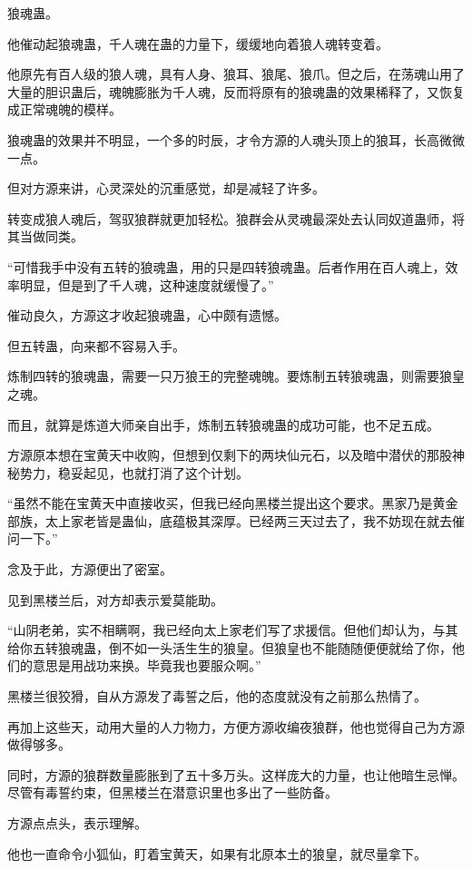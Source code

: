 \begin{this_body}
狼魂蛊。

他催动起狼魂蛊，千人魂在蛊的力量下，缓缓地向着狼人魂转变着。

他原先有百人级的狼人魂，具有人身、狼耳、狼尾、狼爪。但之后，在荡魂山用了大量的胆识蛊后，魂魄膨胀为千人魂，反而将原有的狼魂蛊的效果稀释了，又恢复成正常魂魄的模样。

狼魂蛊的效果并不明显，一个多的时辰，才令方源的人魂头顶上的狼耳，长高微微一点。

但对方源来讲，心灵深处的沉重感觉，却是减轻了许多。

转变成狼人魂后，驾驭狼群就更加轻松。狼群会从灵魂最深处去认同奴道蛊师，将其当做同类。

“可惜我手中没有五转的狼魂蛊，用的只是四转狼魂蛊。后者作用在百人魂上，效率明显，但是到了千人魂，这种速度就缓慢了。”

催动良久，方源这才收起狼魂蛊，心中颇有遗憾。

但五转蛊，向来都不容易入手。

炼制四转的狼魂蛊，需要一只万狼王的完整魂魄。要炼制五转狼魂蛊，则需要狼皇之魂。

而且，就算是炼道大师亲自出手，炼制五转狼魂蛊的成功可能，也不足五成。

方源原本想在宝黄天中收购，但想到仅剩下的两块仙元石，以及暗中潜伏的那股神秘势力，稳妥起见，也就打消了这个计划。

“虽然不能在宝黄天中直接收买，但我已经向黑楼兰提出这个要求。黑家乃是黄金部族，太上家老皆是蛊仙，底蕴极其深厚。已经两三天过去了，我不妨现在就去催问一下。”

念及于此，方源便出了密室。

见到黑楼兰后，对方却表示爱莫能助。

“山阴老弟，实不相瞒啊，我已经向太上家老们写了求援信。但他们却认为，与其给你五转狼魂蛊，倒不如一头活生生的狼皇。但狼皇也不能随随便便就给了你，他们的意思是用战功来换。毕竟我也要服众啊。”

黑楼兰很狡猾，自从方源发了毒誓之后，他的态度就没有之前那么热情了。

再加上这些天，动用大量的人力物力，方便方源收编夜狼群，他也觉得自己为方源做得够多。

同时，方源的狼群数量膨胀到了五十多万头。这样庞大的力量，也让他暗生忌惮。尽管有毒誓约束，但黑楼兰在潜意识里也多出了一些防备。

方源点点头，表示理解。

他也一直命令小狐仙，盯着宝黄天，如果有北原本土的狼皇，就尽量拿下。


\end{this_body}
